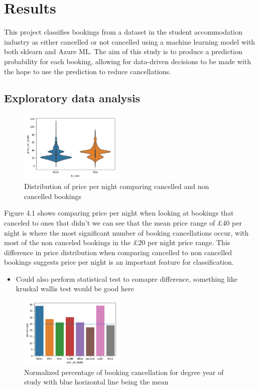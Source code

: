\chapter{Results}
\label{ch:results}

This project classifies bookings from a dataset in the student accommodation industry as either cancelled or not cancelled using a machine learning model with both sklearn and Azure ML. The aim of this study is to produce a prediction probability for each booking, allowing for data-driven decisions to be made with the hope to use the prediction to reduce cancellations. 
\section{Exploratory data analysis}
 \begin{figure}[H]
 \includegraphics[width=5cm]{figures/price_per_night.png}
 \caption{Distribution of price per night comparing cancelled and non cancelled bookings}
\end{figure}
 
 
 Figure 4.1 shows comparing price per night when looking at bookings that canceled to ones that didn't we can see that the mean price range of £40 per night is where the most significant number of booking cancellations occur, with most of the non canceled bookings in the £20 per night price range. This difference in price distribution when comparing cancelled to non cancelled bookings suggests price per night is an important feature for classification. 
 
\begin{itemize}
\item Could also perform statistical test to comapre difference, something like kruskal wallis test would be good here
\end{itemize}

 
 \begin{figure}[H]
\includegraphics[width=5cm]{figures/canc_per_year.png}
 \caption{Normalized percentage of booking cancellation for degree year of study with blue horizontal line being the mean}
\end{figure}
 
